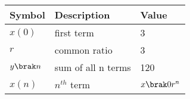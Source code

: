 \begin{tabular}{ | m{1.0cm} | m{3cm} |m{1cm} |} 
  \hline
 Symbol &Description& Value \\ 
 \hline
$x(0)$&first term& 3  \\
\hline
$r$&common ratio & 3  \\
\hline
$y\brak n$& sum of all n terms&120 \\
\hline
$x(n)$&$n^{th}$ term& $ x \brak 0r^{n}$\\
\hline
\end{tabular}\\
\caption{}
\label{Table:1}
